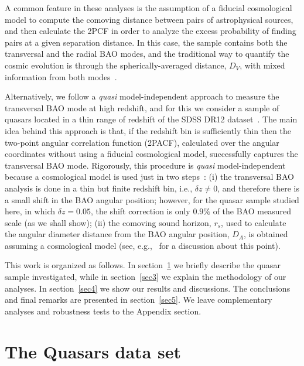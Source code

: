 \documentclass[a4paper,11pt]{article}
\begin{document}
A common feature in these analyses is the assumption of a fiducial cosmological model to compute 
the comoving distance between pairs of astrophysical sources, and then calculate the 2PCF in order 
to analyze the excess probability of finding pairs at a given separation distance. 
In this case, the sample contains both the transversal and the radial BAO modes, and the traditional 
way to quantify the cosmic evolution is through the spherically-averaged distance, $D_V$, 
with mixed information from both modes~\cite{Eisenstein05}. 


Alternatively,  we follow a {\em quasi} model-independent approach to measure the transversal BAO 
mode at high redshift, and for this we consider a sample of quasars located in a thin range of 
redshift of the SDSS DR12 dataset~\cite{Paris}. 
The main idea behind this approach is that, if the redshift bin is sufficiently thin then the two-point 
angular correlation function (2PACF), calculated over the angular coordinates without using a fiducial 
cosmological model, successfully captures the transversal BAO mode. 
Rigorously, this procedure is {\em quasi} model-independent because a cosmological model is used 
just in two steps~\cite{Sanchez11,Carnero,Carvalho,Salazar,Alcaniz}: 
(i) the transversal BAO analysis is done in a thin but finite redshift bin, i.e., $\delta z \ne 0$, and 
    therefore there is a small shift in the BAO angular position; however, for the quasar sample studied 
    here, in which $\delta z = 0.05$, the shift correction is only $0.9\%$ of the BAO measured scale 
    (as we shall show); 
(ii) the comoving sound horizon, $r_{s}$, used to calculate the angular diameter distance from the BAO 
     angular position, $D_A$, is obtained assuming a cosmological model (see, 
     e.g.,~\cite{Heavens,Alcaniz} for a discussion about this point). 

This work is organized as follows. 
In section~\ref{sec2} we briefly describe the quasar sample investigated, while in section~\ref{sec3} 
we explain the methodology of our analyses. 
In section~\ref{sec4} we show our results and discussions.
The conclusions and final remarks are presented in section~\ref{sec5}. 
We leave complementary analyses and robustness tests to the Appendix section. 



\section{The Quasars data set} \label{sec2}
\end{document}
